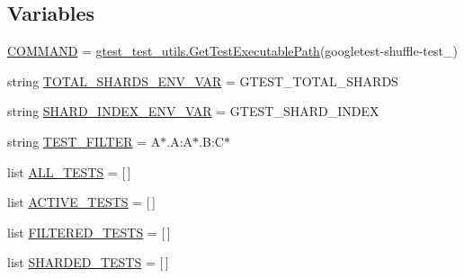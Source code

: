 \subsection*{Variables}
\begin{DoxyCompactItemize}
\item 
\mbox{\hyperlink{namespacegoogletest-master_1_1googletest_1_1test_1_1googletest-shuffle-test_ae8aceb7552b62c5cf38b0bec0c02a6b5}{C\+O\+M\+M\+A\+ND}} = \mbox{\hyperlink{namespacegoogletest-master_1_1googletest_1_1test_1_1gtest__test__utils_a78bbc69ac699e750a6a29188caa643c4}{gtest\+\_\+test\+\_\+utils.\+Get\+Test\+Executable\+Path}}(\textquotesingle{}googletest-\/shuffle-\/test\+\_\+\textquotesingle{})
\item 
string \mbox{\hyperlink{namespacegoogletest-master_1_1googletest_1_1test_1_1googletest-shuffle-test_ad83cf3cb8250955d684742d12f7d86cb}{T\+O\+T\+A\+L\+\_\+\+S\+H\+A\+R\+D\+S\+\_\+\+E\+N\+V\+\_\+\+V\+AR}} = \textquotesingle{}G\+T\+E\+S\+T\+\_\+\+T\+O\+T\+A\+L\+\_\+\+S\+H\+A\+R\+DS\textquotesingle{}
\item 
string \mbox{\hyperlink{namespacegoogletest-master_1_1googletest_1_1test_1_1googletest-shuffle-test_abcc9f5bd42a392fed72cd2d5b4191623}{S\+H\+A\+R\+D\+\_\+\+I\+N\+D\+E\+X\+\_\+\+E\+N\+V\+\_\+\+V\+AR}} = \textquotesingle{}G\+T\+E\+S\+T\+\_\+\+S\+H\+A\+R\+D\+\_\+\+I\+N\+D\+EX\textquotesingle{}
\item 
string \mbox{\hyperlink{namespacegoogletest-master_1_1googletest_1_1test_1_1googletest-shuffle-test_afe59ae5e430b9800ca98385fe69a9ce9}{T\+E\+S\+T\+\_\+\+F\+I\+L\+T\+ER}} = \textquotesingle{}A$\ast$.A\+:A$\ast$.B\+:C$\ast$\textquotesingle{}
\item 
list \mbox{\hyperlink{namespacegoogletest-master_1_1googletest_1_1test_1_1googletest-shuffle-test_ad65486430cc546fc7fb8029a7c89126a}{A\+L\+L\+\_\+\+T\+E\+S\+TS}} = \mbox{[}$\,$\mbox{]}
\item 
list \mbox{\hyperlink{namespacegoogletest-master_1_1googletest_1_1test_1_1googletest-shuffle-test_ae831f2d24d534c560185e2bf658499aa}{A\+C\+T\+I\+V\+E\+\_\+\+T\+E\+S\+TS}} = \mbox{[}$\,$\mbox{]}
\item 
list \mbox{\hyperlink{namespacegoogletest-master_1_1googletest_1_1test_1_1googletest-shuffle-test_a9973a698aee046315141bb4663421e57}{F\+I\+L\+T\+E\+R\+E\+D\+\_\+\+T\+E\+S\+TS}} = \mbox{[}$\,$\mbox{]}
\item 
list \mbox{\hyperlink{namespacegoogletest-master_1_1googletest_1_1test_1_1googletest-shuffle-test_a70f99a6a9f2bbcddc0aae4e63a3e56b7}{S\+H\+A\+R\+D\+E\+D\+\_\+\+T\+E\+S\+TS}} = \mbox{[}$\,$\mbox{]}

\end{DoxyCompactItemize}
